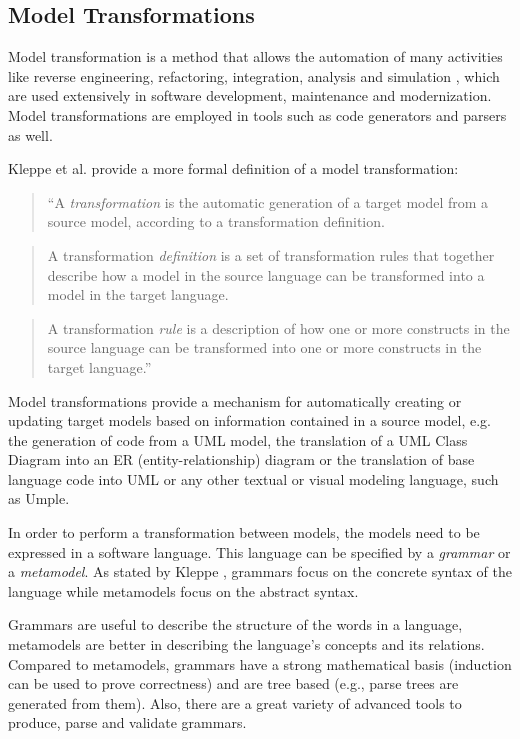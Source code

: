 \subsection{Model Transformations}

Model transformation is a method that allows the automation of many activities like reverse engineering, refactoring, integration, analysis and simulation \cite{biehl2010literature}, which are used extensively in software development, maintenance and modernization. Model transformations are employed in tools such as code generators and parsers as well.

Kleppe et al. \cite{mccKleppe} provide a more formal definition of a model transformation:


\begin{quote}
``A \textit{transformation} is the automatic generation of a target model from a source model, according to a transformation definition. 
\end{quote}
\begin{quote}
A transformation \textit{definition} is a set of transformation rules that together describe how a model in the source language can be transformed into a model in the target language.
\end{quote}
\begin{quote}
A transformation \textit{rule} is a description of how one or more constructs in the source language can be transformed into one or more constructs in the target language.''
\end{quote}

Model transformations provide a mechanism for automatically creating or updating target models based on information contained in a source model, e.g. the generation of code from a UML model, the translation of a UML Class Diagram into an ER (entity-relationship) diagram or the translation of base language code into UML or any other textual or visual modeling language, such as Umple.

In order to perform a transformation between models, the models need to be expressed in a software language. This language can be specified by a \textit{grammar} or a \textit{metamodel}. As stated by Kleppe \cite{kleppe2007language}, grammars focus on the concrete syntax of the language while metamodels focus on the abstract syntax.

Grammars are useful to describe the structure of the words in a language, metamodels are better in describing the language's concepts and its relations. Compared to metamodels, grammars have a strong mathematical basis (induction can be used to prove correctness) and are tree based (e.g., parse trees are generated from them). Also, there are a great variety of  advanced tools to produce, parse and validate grammars.

